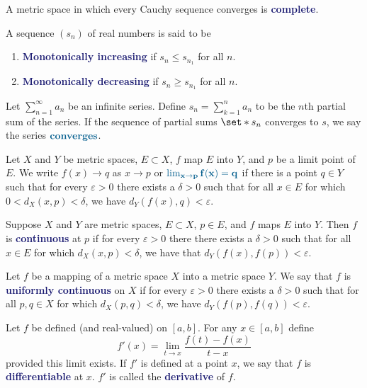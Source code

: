 \documentclass[11pt]{article}
\numberwithin{equation}{section}
\newcommand{\navy}[1]{\textcolor{MidnightBlue}{\bf #1}}
\theoremstyle{definition}
\theoremstyle{definition}
\def\Set{\set*}%
\newcommand{\1}{\mathbbm 1}
\def\d{\delta}
\newcommand{\e}{\varepsilon}
\begin{document}
\begin{definition}[Complete]
A metric space in which every Cauchy sequence converges is \navy{complete}.
\end{definition}

\begin{definition}
A sequence $(s_n)$ of real numbers is said to be
\begin{enumerate}
\item \navy{Monotonically increasing} if $s_n \leq s_{n_1}$ for all $n$.
\item \navy{Monotonically decreasing} if $s_n \geq s_{n_1}$ for all $n$.
\end{enumerate}
\end{definition}

\begin{definition}
Let $\sum_{n=1}^\infty a_n$ be an infinite series. Define $s_n = \sum_{k=1}^n a_n$ to be the $n$th partial sum of the series. If the sequence of partial sums $\Set{s_n}$ converges to $s$, we say the series $\navy{converges}$.
\end{definition}

\begin{definition}[Limit]
Let $X$ and $Y$ be metric spaces, $E \subset X$, $f$ map $E$ into $Y$, and $p$ be a limit point of $E$. We write $f(x) \to q$ as $x \to p$ or $\navy{\lim_{x\to p} f(x) = q}$ if there is a point $q \in Y$ such that for every $\e > 0$ there exists a $\d > 0$ such that for all $x \in E$ for which $0 < d_X(x,p) < \d$, we have $d_Y(f(x),q) < \e$.
\end{definition}

\begin{definition}[Continuous]
Suppose $X$ and $Y$ are metric spaces, $E \subset X$, $p \in E$, and $f$ maps $E$ into $Y$. Then $f$ is \navy{continuous} at $p$ if for every $\e > 0$ there there exists a $\d > 0$ such that for all $x \in E$ for which $d_X(x,p) < \d$, we have that $d_Y(f(x), f(p)) < \e$.
\end{definition}

\begin{definition}
Let $f$ be a mapping of a metric space $X$ into a metric space $Y$. We say that $f$ is \navy{uniformly continuous} on $X$ if for every $\e > 0$ there exists a $\d > 0$ such that for all $p,q \in X$ for which $d_X(p,q) < \delta$, we have $d_Y(f(p),f(q)) < \e$.
\end{definition}

\begin{definition}
Let $f$ be defined (and real-valued) on $[a,b]$. For any $x \in [a,b]$ define
\begin{equation}
f'(x) = \lim_{t \to x} \frac{f(t) - f(x)}{t - x}
\end{equation}
provided this limit exists. If $f'$ is defined at a point $x$, we say that $f$ is \navy{differentiable} at $x$. $f'$ is called the \navy{derivative} of $f$.
\end{definition}
\end{document}
